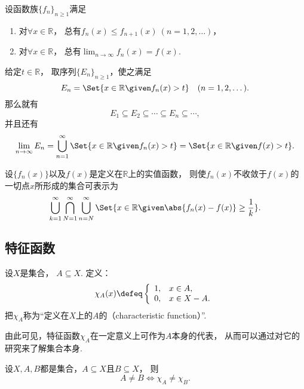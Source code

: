 \begin{example}
设函数族\(\{f_n\}_{n\geq1}\)满足
\begin{enumerate}
	\item 对\(\forall x\in\mathbb{R}\)，
	总有\(f_n(x) \leq f_{n+1}(x)\ (n=1,2,\dotsc)\)，
	\item 对\(\forall x\in\mathbb{R}\)，
	总有\(\lim_{n\to\infty} f_n(x) = f(x)\).
\end{enumerate}
给定\(t\in\mathbb{R}\)，
取序列\(\{E_n\}_{n\geq1}\)，使之满足\[
	E_n = \Set{ x\in\mathbb{R} \given f_n(x) > t }
	\quad(n=1,2,\dotsc).
\]
那么就有\[
	E_1 \subseteq E_2 \subseteq \dotsb \subseteq E_n \subseteq \dotsb,
\]
并且还有\[
	\lim_{n\to\infty} E_n
	= \bigcup_{n=1}^\infty \Set{ x\in\mathbb{R} \given f_n(x) > t }
	= \Set{ x\in\mathbb{R} \given f(x) > t }.
\]
\end{example}

\begin{proposition}
设\(\{f_n(x)\}\)以及\(f(x)\)是定义在\(\mathbb{R}\)上的实值函数，
则使\(f_n(x)\)不收敛于\(f(x)\)的一切点\(x\)所形成的集合可表示为\[
	\bigcup_{k=1}^\infty
	\bigcap_{N=1}^\infty
	\bigcup_{n=N}^\infty
	\Set{
		x\in\mathbb{R}
		\given
		\abs{f_n(x) - f(x)} \geq \frac1k
	}.
\]
\end{proposition}

\subsection{特征函数}
\begin{definition}
设\(X\)是集合，
\(A \subseteq X\).
定义：\[
	\chi_A(x)
	\defeq
	\left\{ \begin{array}{cl}
		1, & x \in A, \\
		0, & x \in X - A.
	\end{array} \right.
\]
把\(\chi_A\)称为“定义在\(X\)上的\(A\)的（characteristic function）”.
\end{definition}
由此可见，特征函数\(\chi_A\)在一定意义上可作为\(A\)本身的代表，
从而可以通过对它的研究来了解集合本身.

\begin{proposition}
设\(X,A,B\)都是集合，\(A \subseteq X\)且\(B \subseteq X\)，
则\[
	A \neq B \iff \chi_A \neq \chi_B.
\]
\end{proposition}

